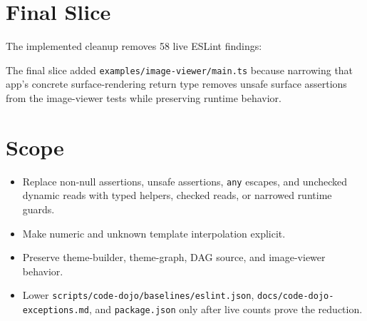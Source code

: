 \section{Final Slice}\label{record-223-final-slice}

The implemented cleanup removes 58 live ESLint findings:



The final slice added \texttt{e\allowbreak{}x\allowbreak{}a\allowbreak{}m\allowbreak{}p\allowbreak{}l\allowbreak{}e\allowbreak{}s\allowbreak{}/\allowbreak{}i\allowbreak{}m\allowbreak{}a\allowbreak{}g\allowbreak{}e\allowbreak{}-\allowbreak{}v\allowbreak{}i\allowbreak{}e\allowbreak{}w\allowbreak{}e\allowbreak{}r\allowbreak{}/\allowbreak{}m\allowbreak{}a\allowbreak{}i\allowbreak{}n\allowbreak{}.\allowbreak{}t\allowbreak{}s} because narrowing that app's concrete surface-rendering return type removes unsafe surface assertions from the image-viewer tests while preserving runtime behavior.

\section{Scope}\label{record-223-scope}

\begin{itemize}
\tightlist
\item
  Replace non-null assertions, unsafe assertions, \texttt{a\allowbreak{}n\allowbreak{}y} escapes, and unchecked dynamic reads with typed helpers, checked reads, or narrowed runtime guards.
\item
  Make numeric and unknown template interpolation explicit.
\item
  Preserve theme-builder, theme-graph, DAG source, and image-viewer behavior.
\item
  Lower \texttt{s\allowbreak{}c\allowbreak{}r\allowbreak{}i\allowbreak{}p\allowbreak{}t\allowbreak{}s\allowbreak{}/\allowbreak{}c\allowbreak{}o\allowbreak{}d\allowbreak{}e\allowbreak{}-\allowbreak{}d\allowbreak{}o\allowbreak{}j\allowbreak{}o\allowbreak{}/\allowbreak{}b\allowbreak{}a\allowbreak{}s\allowbreak{}e\allowbreak{}l\allowbreak{}i\allowbreak{}n\allowbreak{}e\allowbreak{}s\allowbreak{}/\allowbreak{}e\allowbreak{}s\allowbreak{}l\allowbreak{}i\allowbreak{}n\allowbreak{}t\allowbreak{}.\allowbreak{}j\allowbreak{}s\allowbreak{}o\allowbreak{}n}, \texttt{d\allowbreak{}o\allowbreak{}c\allowbreak{}s\allowbreak{}/\allowbreak{}c\allowbreak{}o\allowbreak{}d\allowbreak{}e\allowbreak{}-\allowbreak{}d\allowbreak{}o\allowbreak{}j\allowbreak{}o\allowbreak{}-\allowbreak{}e\allowbreak{}x\allowbreak{}c\allowbreak{}e\allowbreak{}p\allowbreak{}t\allowbreak{}i\allowbreak{}o\allowbreak{}n\allowbreak{}s\allowbreak{}.\allowbreak{}m\allowbreak{}d}, and \texttt{p\allowbreak{}a\allowbreak{}c\allowbreak{}k\allowbreak{}a\allowbreak{}g\allowbreak{}e\allowbreak{}.\allowbreak{}j\allowbreak{}s\allowbreak{}o\allowbreak{}n} only after live counts prove the reduction.
\end{itemize}

